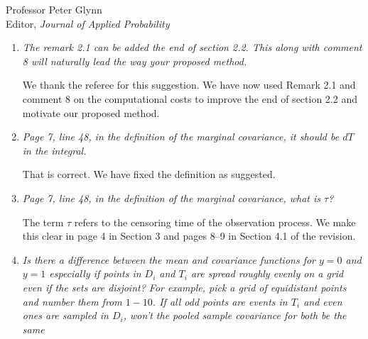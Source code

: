 \documentclass[11pt]{letter} %
\begin{document}
\begin{letter}{Professor
	Peter Glynn\\
	Editor, {\em Journal of Applied Probability}}
\begin{enumerate}
\item{\it The remark 2.1 can be added the end of section 2.2. This along with
comment 8 will naturally lead the way your proposed method.}

\vspace{5mm}
We thank the referee for this suggestion.  We have now used Remark 2.1 and comment 8 on the computational costs to improve the end of section 2.2 and motivate our proposed method.
\vspace{5mm}

\item {\it Page 7, line 48, in the definition of the marginal covariance, it should be $dT$ in the integral.}

\vspace{5mm}
That is correct.  We have fixed the definition as suggested.
\vspace{5mm}

\item {\it Page 7, line 48, in the definition of the marginal covariance, what is $\tau$?}

\vspace{5mm}
The term $\tau$ refers to the censoring time of the observation process. We make this clear in page 4 in Section 3 and pages 8--9 in Section 4.1 of the revision.
\vspace{5mm}


\item {\it Is there a difference between the mean and covariance functions for $y = 0$ and $y = 1$ especially if points in $D_i$ and $T_i$ are spread roughly evenly on a grid even if the sets are disjoint? For example, pick a grid of equidistant points and number them from $1-10$. If all odd points are events in $T_i$ and even ones are sampled in $D_i$, won't the pooled sample covariance for both be the same}


\end{enumerate}
\end{letter}
\end{document}
